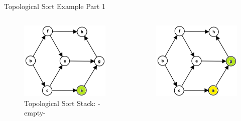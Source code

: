 \documentclass[aspectratio=169]{beamer}%
\begin{document}
\begin{frame}{Topological Sort Example Part 1}
    \begin{columns}
        \begin{column}{.32\textwidth}
            \begin{figure}
                \centering
                \includegraphics[width = .9\linewidth]{topsort1.png}
                \caption{Topological Sort Stack: -empty-}
            \end{figure}
        \end{column}
        \hfill
        \begin{column}{.32\textwidth}
            \begin{figure}
                \centering
                \includegraphics[width = .9\linewidth]{topsort2.png}

\end{figure}
\end{column}
\end{columns}
\end{frame}
\end{document}
